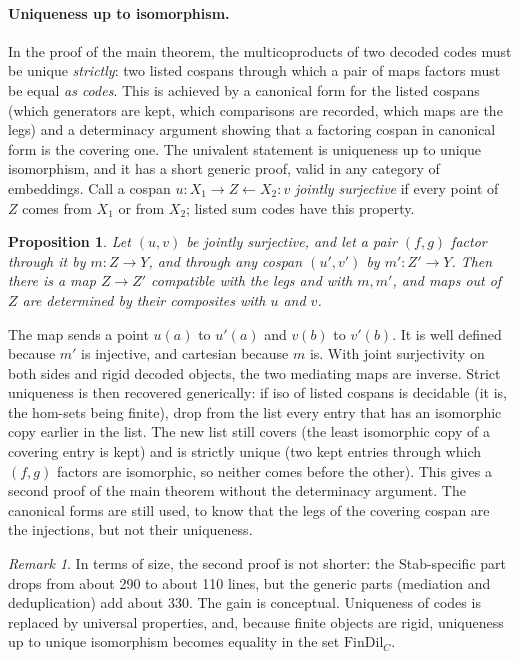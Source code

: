 \documentclass[11pt]{article}
\newtheorem{proposition}[theorem]{Proposition}
\theoremstyle{definition}
\theoremstyle{remark}
\newtheorem{remark}[theorem]{Remark}
\begin{document}
\paragraph{Uniqueness up to isomorphism.} In the proof of the main theorem,
the multicoproducts of two decoded codes must be unique \emph{strictly}:
two listed cospans through which a pair of maps factors must be equal
\emph{as codes}. This is achieved by a canonical form for the listed
cospans (which generators are kept, which comparisons are recorded, which
maps are the legs) and a determinacy argument showing that a factoring
cospan in canonical form is the covering one. The univalent statement is
uniqueness up to unique isomorphism, and it has a short generic proof, valid
in any category of embeddings. Call a cospan $u:X_1\to Z\leftarrow X_2:v$
\emph{jointly surjective} if every point of $Z$ comes from $X_1$ or from
$X_2$; listed sum codes have this property.

\begin{proposition}
Let $(u,v)$ be jointly surjective, and let a pair $(f,g)$ factor through it
by $m:Z\to Y$, and through any cospan $(u',v')$ by $m':Z'\to Y$. Then there
is a map $Z\to Z'$ compatible with the legs and with $m,m'$, and maps out
of $Z$ are determined by their composites with $u$ and $v$.
\end{proposition}

The map sends a point $u(a)$ to $u'(a)$ and $v(b)$ to $v'(b)$. It is well
defined because $m'$ is injective, and cartesian because $m$ is. With joint
surjectivity on both sides and rigid decoded objects, the two mediating
maps are inverse. Strict uniqueness is then recovered generically: if iso
of listed cospans is decidable (it is, the hom-sets being finite), drop
from the list every entry that has an isomorphic copy earlier in the list.
The new list still covers (the least isomorphic copy of a covering entry is
kept) and is strictly unique (two kept entries through which $(f,g)$
factors are isomorphic, so neither comes before the other). This gives a
second proof of the main theorem without the determinacy argument. The
canonical forms are still used, to know that the legs of the covering
cospan are the injections, but not their uniqueness.

\begin{remark}
In terms of size, the second proof is not shorter: the Stab-specific part
drops from about 290 to about 110 lines, but the generic parts (mediation
and deduplication) add about 330. The gain is conceptual. Uniqueness of
codes is replaced by universal properties, and, because finite objects are
rigid, uniqueness up to unique isomorphism becomes equality in the set
$\mathrm{FinDil}_C$.
\end{remark}
\end{document}
